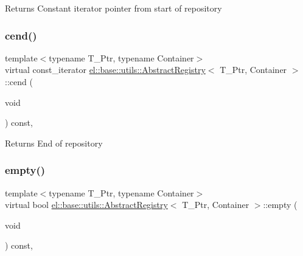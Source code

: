 \begin{DoxyReturn}{Returns}
Constant iterator pointer from start of repository 
\end{DoxyReturn}
\mbox{\label{classel_1_1base_1_1utils_1_1_abstract_registry_ad3ee081b4b25c5d77f971f949bdb9158}} 
\subsubsection{\texorpdfstring{cend()}{cend()}}
{\footnotesize\ttfamily template$<$typename T\+\_\+\+Ptr, typename Container$>$ \\
virtual const\+\_\+iterator \hyperlink{classel_1_1base_1_1utils_1_1_abstract_registry}{el\+::base\+::utils\+::\+Abstract\+Registry}$<$ T\+\_\+\+Ptr, Container $>$\+::cend (\begin{DoxyParamCaption}\item[{void}]{ }\end{DoxyParamCaption}) const\hspace{0.3cm}{\ttfamily [inline]}, {\ttfamily [virtual]}}

\begin{DoxyReturn}{Returns}
End of repository 
\end{DoxyReturn}
\mbox{\label{classel_1_1base_1_1utils_1_1_abstract_registry_a43ff6484b778c298416c482c07a4df3f}} 
\subsubsection{\texorpdfstring{empty()}{empty()}}
{\footnotesize\ttfamily template$<$typename T\+\_\+\+Ptr, typename Container$>$ \\
virtual bool \hyperlink{classel_1_1base_1_1utils_1_1_abstract_registry}{el\+::base\+::utils\+::\+Abstract\+Registry}$<$ T\+\_\+\+Ptr, Container $>$\+::empty (\begin{DoxyParamCaption}\item[{void}]{ }\end{DoxyParamCaption}) const\hspace{0.3cm}{\ttfamily [inline]}, {\ttfamily [virtual]}}

